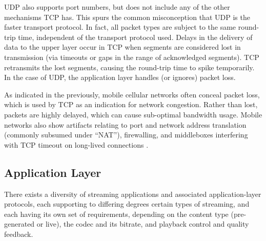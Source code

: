 UDP also supports port numbers, but does not include any of the other mechanisms TCP has. This spurs the common misconception that UDP is the faster transport protocol. In fact, all packet types are subject to the same round-trip time, independent of the transport protocol used. Delays in the delivery of data to the upper layer occur in TCP when segments are considered lost in transmission (via timeouts or gaps in the range of acknowledged segments). TCP retransmits the lost segments, causing the round-trip time to spike temporarily. In the case of UDP, the application layer handles (or ignores) packet loss.

As indicated in the previously, mobile cellular networks often conceal packet loss, which is used by TCP as an indication for network congestion. Rather than lost, packets are highly delayed, which can cause sub-optimal bandwidth usage. Mobile networks also show artifacts relating to port and network address translation (commonly subsumed under ``NAT''), firewalling, and middleboxes interfering with TCP timeout on long-lived connections \cite{wang2011untold}.


%




\subsection{Application Layer}

There exists a diversity of streaming applications and associated application-layer protocols, each supporting to differing degrees certain types of streaming, and each having its own set of requirements, depending on the content type (pre-generated or live), the codec and its bitrate, and playback control and quality feedback.

